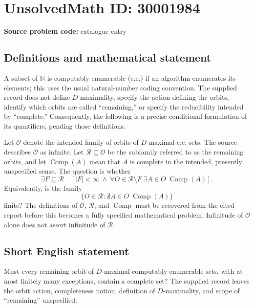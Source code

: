 \documentclass[11pt]{article}
\newcommand{\N}{\mathbb{N}}
\begin{document}
\section*{UnsolvedMath ID: 30001984}
\textbf{Source problem code:} catalogue entry
\subsection{Definitions and mathematical statement}
A subset of \(\N\) is computably enumerable (c.e.) if an algorithm enumerates its elements; this uses the usual natural-number coding convention. The supplied record does not define \(D\)-maximality, specify the action defining the orbits, identify which orbits are called ``remaining,'' or specify the reducibility intended by ``complete.'' Consequently, the following is a precise conditional formulation of its quantifiers, pending those definitions.

Let \(\mathscr O\) denote the intended family of orbits of \(D\)-maximal c.e. sets. The source describes \(\mathscr O\) as infinite. Let \(\mathscr R\subseteq\mathscr O\) be the subfamily referred to as the remaining orbits, and let \(\operatorname{Comp}(A)\) mean that \(A\) is complete in the intended, presently unspecified sense. The question is whether
\[
\exists F\subseteq\mathscr R\quad
\left[|F|<\infty\ \land\
\forall O\in\mathscr R\setminus F\;
\exists A\in O\;\operatorname{Comp}(A)\right].
\]
Equivalently, is the family
\[
\bigl\{O\in\mathscr R:\nexists A\in O\;\operatorname{Comp}(A)\bigr\}
\]
finite? The definitions of \(\mathscr O\), \(\mathscr R\), and \(\operatorname{Comp}\) must be recovered from the cited report before this becomes a fully specified mathematical problem. Infinitude of \(\mathscr O\) alone does not assert infinitude of \(\mathscr R\).
\subsection{Short English statement}
Must every remaining orbit of \(D\)-maximal computably enumerable sets, with at most finitely many exceptions, contain a complete set? The supplied record leaves the orbit action, completeness notion, definition of \(D\)-maximality, and scope of ``remaining'' unspecified.
\end{document}
